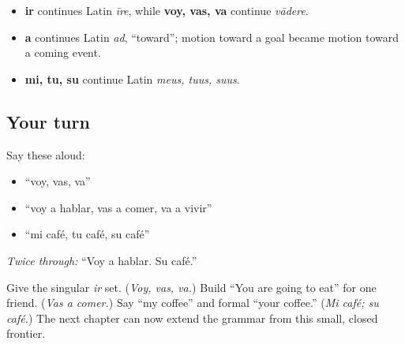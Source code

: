 \begin{cousinweb}
\begin{itemize}
\raggedright
  \item \textbf{ir} continues Latin \emph{īre}, while \textbf{voy, vas, va} continue \emph{vādere}.
  \item \textbf{a} continues Latin \emph{ad}, “toward”; motion toward a goal became motion toward a coming event.
  \item \textbf{mi, tu, su} continue Latin \emph{meus, tuus, suus}.
\end{itemize}
\end{cousinweb}

\subsection*{Your turn}
Say these aloud:

\begin{itemize}
\raggedright
  \item “voy, vas, va”
  \item “voy a hablar, vas a comer, va a vivir”
  \item “mi café, tu café, su café”
\end{itemize}

\emph{Twice through:} “Voy a hablar. Su café.”

\begin{tcolorbox}[breakable,colback=teal!4,colframe=teal!35!black,title={Before you move on}]
Give the singular \emph{ir} set. (\emph{Voy, vas, va.}) Build “You are going to eat” for one friend. (\emph{Vas a comer.}) Say “my coffee” and formal “your coffee.” (\emph{Mi café; su café.}) The next chapter can now extend the grammar from this small, closed frontier.
\end{tcolorbox}
